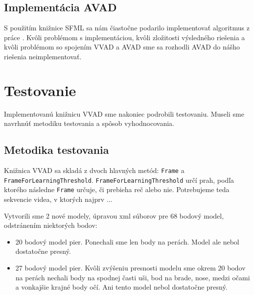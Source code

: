 \section{Implementácia AVAD}
S použitím knižnice SFML \cite{SFML} sa nám čiastočne podarilo implementovať algoritmus z práce  \cite{moattar2009simple}. 
Kvôli problémom s implementáciou, kvôli zložitosti výsledného riešenia a kvôli problémom so spojením VVAD a AVAD sme sa rozhodli AVAD do nášho riešenia neimplementovať.

\chapter{Testovanie}
Implementovanú knižnicu VVAD sme nakoniec podrobili testovaniu.
Museli sme navrhnúť metodiku testovania a spôsob vyhodnocovania. 

\section{Metodika testovania}
Knižnica VVAD sa skladá z dvoch hlavných metód: \texttt{Frame} a \texttt{FrameForLearningThreshold}. 
\texttt{FrameForLearningThreshold} určí prah, podľa ktorého následne \texttt{Frame} určuje, či prebieha reč alebo nie.
Potrebujeme teda sekvencie videa, v ktorých najprv ...

Vytvorili sme 2 nové modely, úpravou xml súborov pre 68 bodový model, odstránením niektorých bodov:
\begin{itemize}
	\item 20 bodový model pier. 
	Ponechali sme len body na perách. 
	Model ale nebol dostatočne presný.
	\item 27 bodový model pier.
	Kvôli zvýšeniu presnosti modelu sme okrem 20 bodov na perách nechali body na spodnej časti uši, bod na brade, nose, medzi očami a vonkajšie krajné body očí.
	Ani tento model nebol dostatočne presný.
\end{itemize}